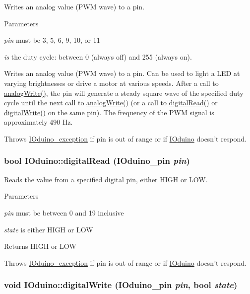 Writes an analog value (PWM wave) to a pin. 


\begin{DoxyParams}{Parameters}
\item[{\em pin}]must be 3, 5, 6, 9, 10, or 11 \item[{\em is}]the duty cycle: between 0 (always off) and 255 (always on).\end{DoxyParams}
Writes an analog value (PWM wave) to a pin. Can be used to light a LED at varying brightnesses or drive a motor at various speeds. After a call to \hyperlink{classIOduino_a8fc8b7253bb8c4e7a339997221ce3522}{analogWrite()}, the pin will generate a steady square wave of the specified duty cycle until the next call to \hyperlink{classIOduino_a8fc8b7253bb8c4e7a339997221ce3522}{analogWrite()} (or a call to \hyperlink{classIOduino_afb5c2f8e8ac382964debda0b4a86cd00}{digitalRead()} or \hyperlink{classIOduino_ab24475bba0e8ddea4257a561a3b21263}{digitalWrite()} on the same pin). The frequency of the PWM signal is approximately 490 Hz.

Throws \hyperlink{classIOduino__exception}{IOduino\_\-exception} if pin is out of range or if \hyperlink{classIOduino}{IOduino} doesn't respond. \hypertarget{classIOduino_afb5c2f8e8ac382964debda0b4a86cd00}{
\subsubsection[{digitalRead}]{\setlength{\rightskip}{0pt plus 5cm}bool IOduino::digitalRead (IOduino\_\-pin {\em pin})}}
\label{classIOduino_afb5c2f8e8ac382964debda0b4a86cd00}


Reads the value from a specified digital pin, either HIGH or LOW. 


\begin{DoxyParams}{Parameters}
\item[{\em pin}]must be between 0 and 19 inclusive \item[{\em state}]is either HIGH or LOW\end{DoxyParams}
Returns HIGH or LOW

Throws \hyperlink{classIOduino__exception}{IOduino\_\-exception} if pin is out of range or if \hyperlink{classIOduino}{IOduino} doesn't respond. \hypertarget{classIOduino_ab24475bba0e8ddea4257a561a3b21263}{
\subsubsection[{digitalWrite}]{\setlength{\rightskip}{0pt plus 5cm}void IOduino::digitalWrite (IOduino\_\-pin {\em pin}, \/  bool {\em state})}}
\label{classIOduino_ab24475bba0e8ddea4257a561a3b21263}


